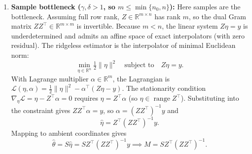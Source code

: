 \begin{remark}
\begin{enumerate}
  \item \textbf{Sample bottleneck ($\gamma,\delta>1$, so $m\le\min\{n_0,n\}$):}
  Here samples are the bottleneck. Assuming full row rank, $Z\in\mathbb R^{m\times n}$ has rank $m$, so the dual Gram matrix $ZZ^\top\in\mathbb R^{m\times m}$ is invertible.
  Because $m<n$, the linear system $Z\eta=y$ is underdetermined and admits an affine space of exact interpolators (with zero residual). The ridgeless estimator is the interpolator of minimal Euclidean norm:
  \[
    \min_{\eta\in\mathbb R^n} \tfrac12\|\eta\|^2 \quad\text{subject to}\quad Z\eta=y.
  \]
  With Lagrange multiplier $\alpha\in\mathbb R^m$, the Lagrangian is $\mathcal L(\eta,\alpha)=\tfrac12\|\eta\|^2-\alpha^\top(Z\eta-y)$. The stationarity condition $\nabla_\eta\mathcal L=\eta-Z^\top\alpha=0$ requires $\eta=Z^\top\alpha$ (so $\eta\in\operatorname{range}Z^\top$). Substituting into the constraint gives $ZZ^\top\alpha=y$, so $\alpha=(ZZ^\top)^{-1}y$ and
  \[
    \hat\eta = Z^\top(ZZ^\top)^{-1}y.
  \]
  Mapping to ambient coordinates gives
  \[
    \hat\theta = S\hat\eta = SZ^\top(ZZ^\top)^{-1}y \implies M = SZ^\top(ZZ^\top)^{-1}.
  \]


\end{enumerate}
\end{remark}
